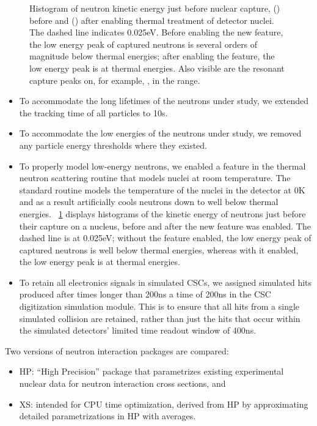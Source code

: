 \begin{figure}[htbp]
  \caption[Histogram of neutron kinetic energy just before nuclear capture, before and after enabling thermal treatment of detector nuclei.]{Histogram of neutron kinetic energy just before nuclear capture, () before and () after enabling thermal treatment of detector nuclei. The dashed line indicates 0.025\unit{eV}. Before enabling the new feature, the low energy peak of captured neutrons is several orders of magnitude below thermal energies; after enabling the feature, the low energy peak is at thermal energies. Also visible are the resonant capture peaks on, for example, , in the \keVns range.}
	\label{fig:nKE}
\end{figure}

\begin{itemize}
	\item To accommodate the long lifetimes of the neutrons under study, we extended the tracking time of all particles to 10\unit{s}.
	\item To accommodate the low energies of the neutrons under study, we removed any particle energy thresholds where they existed.
	\item To properly model low-energy neutrons, we enabled a feature in the \GEANTfour thermal neutron scattering routine that models nuclei at room temperature. The standard \GEANTfour routine models the temperature of the nuclei in the detector at 0\unit{K} and as a result artificially cools neutrons down to well below thermal energies. \Fig~\ref{fig:nKE} displays histograms of the kinetic energy of neutrons just before their capture on a nucleus, before and after the new feature was enabled. The dashed line is at 0.025\unit{eV}; without the feature enabled, the low energy peak of captured neutrons is well below thermal energies, whereas with it enabled, the low energy peak is at thermal energies.
	\item To retain all electronics signals in simulated CSCs, we assigned simulated hits produced after times longer than 200\unit{ns} a time of 200\unit{ns} in the CSC digitization simulation module. This is to ensure that all hits from a single simulated \pp collision are retained, rather than just the hits that occur within the simulated detectors' limited time readout window of 400\unit{ns}.
\end{itemize}

Two versions of \GEANTfour neutron interaction packages are compared:

\begin{itemize}
	\item HP: ``High Precision'' package that parametrizes existing experimental nuclear data for neutron interaction cross sections, and
	\item XS: intended for CPU time optimization, derived from HP by approximating detailed parametrizations in HP with averages.
\end{itemize}


